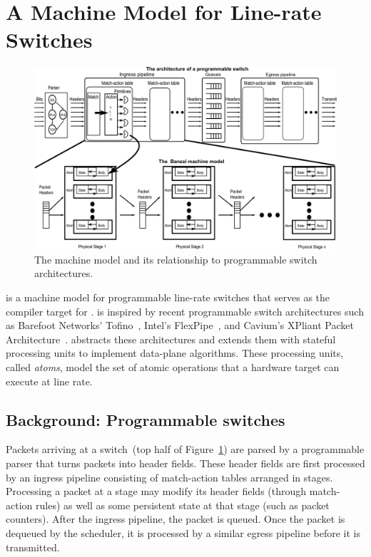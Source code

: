 \section{A Machine Model for Line-rate Switches}
\label{s:absmachine}

\begin{figure}[!t]
  \includegraphics[width=\textwidth]{banzai.pdf}
  \caption{The \absmachine machine model and its relationship to
  programmable switch architectures.}
  \label{fig:switch}
\end{figure}

\absmachine is a machine model for programmable line-rate switches that serves
as the compiler target for \pktlanguage.  \absmachine is inspired by recent
programmable switch architectures such as Barefoot Networks' Tofino~\cite{tofino},
Intel's FlexPipe~\cite{flexpipe}, and Cavium's XPliant Packet
Architecture~\cite{xpliant}. \absmachine abstracts these architectures and
extends them with stateful processing units to implement data-plane algorithms.
These processing units, called {\em atoms}, model the set of atomic operations
that a hardware target can execute at line rate.

\subsection{Background: Programmable switches}
Packets arriving at a switch~(top half of Figure~\ref{fig:switch}) are parsed
by a programmable parser that turns packets into header fields. These header
fields are first processed by an ingress pipeline consisting of match-action
tables arranged in stages. Processing a packet at a stage may modify its header
fields (through match-action rules) as well as some persistent state at that
stage (such as packet counters). After the ingress pipeline, the packet is
queued. Once the packet is dequeued by the scheduler, it is processed by a
similar egress pipeline before it is transmitted.

